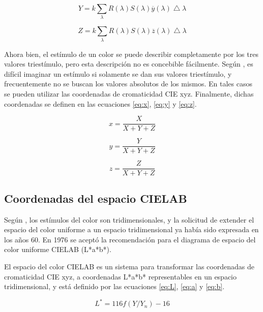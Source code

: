 		\begin{equation}\label{eq:Ysum}
			Y = k \sum_{\lambda} R(\lambda) S(\lambda) \overline{y}(\lambda)\bigtriangleup\lambda
		\end{equation}
		
		\begin{equation}\label{eq:Zsum}
			Z = k \sum_{\lambda} R(\lambda) S(\lambda) \overline{z}(\lambda)\bigtriangleup\lambda
		\end{equation}
		
		Ahora bien, el est\'{i}mulo de un color se puede describir completamente por los tres valores triest\'{i}mulo, pero esta descripci\'{o}n no es concebible f\'{a}cilmente. Seg\'{u}n \cite{Schanda}, es dif\'{i}cil imaginar un est\'{i}mulo si solamente se dan sus valores triest\'{i}mulo, y frecuentemente no se buscan los valores absolutos de los mismos. En tales casos se pueden utilizar las coordenadas de cromaticidad CIE xyz. Finalmente, dichas coordenadas se definen en las ecuaciones \ref{eq:x}, \ref{eq:y} y \ref{eq:z}.
		
		\begin{equation}\label{eq:x}
			x = \frac{X}{X+Y+Z}
		\end{equation}
		
		\begin{equation}\label{eq:y}
			y = \frac{Y}{X+Y+Z}
		\end{equation}
		
		\begin{equation}\label{eq:z}
			z = \frac{Z}{X+Y+Z}
		\end{equation}

	\subsection{Coordenadas del espacio CIELAB}
	
		Seg\'{u}n \cite{Schanda}, los est\'{i}mulos del color son tridimensionales, y la solicitud de extender el espacio del color uniforme a un espacio tridimensional ya hab\'{i}a sido expresada en los a\~{n}os 60. En 1976 se acept\'{o} la recomendaci\'{o}n para el diagrama de espacio del color uniforme CIELAB (L*a*b*).
		
		El espacio del color CIELAB es un sistema para transformar las coordenadas de cromaticidad CIE xyz, a coordenadas L*a*b* representables en un espacio tridimensional, y est\'{a} definido por las ecuaciones \ref{eq:L}, \ref{eq:a} y \ref{eq:b}.
		
		\begin{equation}\label{eq:L}
			L^* = 116f(Y/Y_n) - 16
		\end{equation}
		
